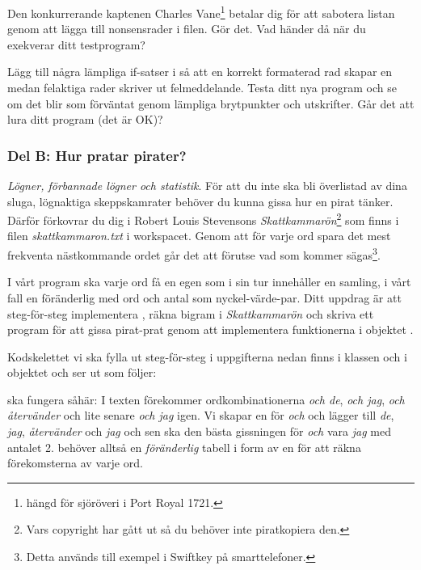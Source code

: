 \Subtask Den konkurrerande kaptenen Charles Vane\footnote{hängd för sjöröveri i Port Royal 1721.} betalar dig för att sabotera listan genom att lägga till nonsensrader i filen. Gör det. Vad händer då när du exekverar ditt testprogram?

\Subtask Lägg till några lämpliga if-satser i  så att en korrekt formaterad rad skapar en  medan felaktiga rader skriver ut felmeddelande.
Testa ditt nya program och se om det blir som förväntat genom lämpliga brytpunkter och utskrifter. Går det att lura ditt program (det är OK)?

\subsubsection {Del B: Hur pratar pirater?}

\emph{Lögner, förbannade lögner och statistik}. För att du inte ska bli överlistad av dina sluga, lögnaktiga skeppskamrater behöver du kunna gissa hur en pirat tänker. Därför förkovrar du dig i Robert Louis Stevensons \emph{Skattkammarön}\footnote{Vars copyright har gått ut så du behöver inte piratkopiera den.} som finns i filen \emph{skattkammaron.txt} i workspacet.  Genom att för varje ord spara det mest frekventa nästkommande ordet går det att förutse vad som kommer sägas\footnote{Detta används till exempel i Swiftkey på smarttelefoner.}.


I vårt program ska varje ord få en egen  som i sin tur innehåller en samling, i vårt fall en föränderlig  med ord och antal som nyckel-värde-par. Ditt uppdrag är att steg-för-steg implementera , räkna bigram i \emph{Skattkammarön} och skriva ett program för att gissa pirat-prat genom att implementera funktionerna i objektet .

Kodskelettet vi ska fylla ut steg-för-steg i uppgifterna nedan finns i klassen  och i objektet  och ser ut som följer:
\newpage
{}



 ska fungera såhär: I texten förekommer ordkombinationerna \emph{och de}, \emph{och jag}, \emph{och återvänder} och lite senare \emph{och jag} igen. Vi skapar en  för \emph{och} och lägger till \emph{de}, \emph{jag}, \emph{återvänder} och \emph{jag} och sen ska den bästa gissningen för \emph{och} vara \emph{jag} med antalet 2.  behöver alltså en \emph{föränderlig} tabell i form av en  för att räkna förekomsterna av varje ord.


